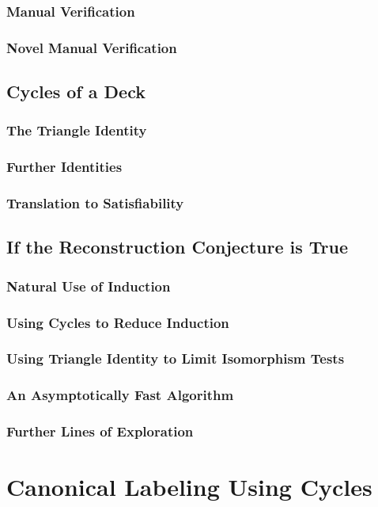 \documentclass[11pt,a4paper]{report}
\begin{document}
\subsection{Manual Verification}
\subsection{Novel Manual Verification}

\section{Cycles of a Deck}
\subsection{The Triangle Identity}
\subsection{Further Identities}
\subsection{Translation to Satisfiability}

\section{If the Reconstruction Conjecture is True}
\subsection{Natural Use of Induction}
\subsection{Using Cycles to Reduce Induction}
\subsection{Using Triangle Identity to Limit Isomorphism Tests}
\subsection{An Asymptotically Fast Algorithm}
\subsection{Further Lines of Exploration}



\chapter{Canonical Labeling Using Cycles}
\end{document}
